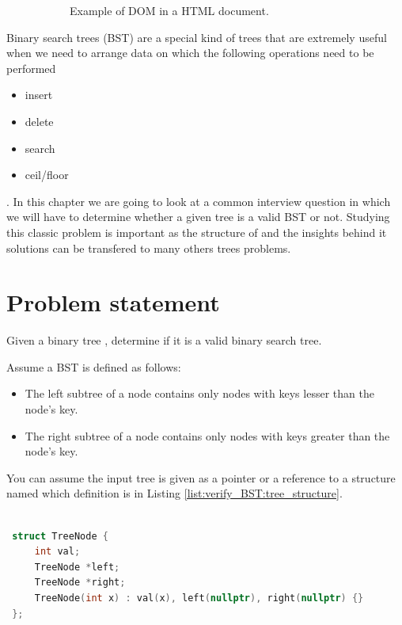 \begin{figure}
\begin{subfigure}[t]{0.46\textwidth}
		\caption[]{Example of DOM in a HTML document.}
		\label{fig:verify:DOM}
	 \end{subfigure}
	 \caption[]{}
	  \label{fig:verify:trees}
\end{figure}



Binary search trees (BST) are a special kind of trees that are extremely useful when we need to arrange data on which the following operations need to be performed
\begin{itemize}
	\item insert
	\item delete
	\item search
	\item ceil/floor
\end{itemize}.
In this chapter we are going to look at a common interview question in which we will have to determine whether a given tree is a valid BST or not. 
Studying this classic problem is important as the structure of and the insights behind it solutions can be transfered to many others trees problems.

\section{Problem statement}
\begin{exercise}

Given a binary tree \cite{cit:wiki:BST}, determine if it is a valid binary search tree.

Assume a BST is defined as follows:
\begin{itemize}
	\item The left subtree of a node contains only nodes with keys lesser than the node's key.
	\item The right subtree of a node contains only nodes with keys greater than the node's key.
\end{itemize}

You can assume the input tree is given as a pointer or a reference to a structure named  which definition is in Listing \ref{list:verify_BST:tree_structure}. 

\end{exercise}

\begin{lstlisting}[language=c++, caption=Binary tree definition used in this exercice.,label=list:verify_BST:tree_structure]

 struct TreeNode {
     int val;
     TreeNode *left;
     TreeNode *right;
     TreeNode(int x) : val(x), left(nullptr), right(nullptr) {}
 };
 \end{lstlisting}



